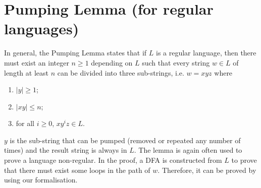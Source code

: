 \section{Pumping Lemma (for regular languages)}
\par In general, the
Pumping Lemma states that if \(L\) is a regular language, then there
must exist an integer \(n \geq 1\) depending on \(L\) such that every
string \(w \in L\) of length at least \(n\) can be divided into three
sub-strings, i.e. \(w = xyz\) where
\begin{enumerate}[nolistsep]
  \item \(|y| \geq 1\);
  \item \(|xy| \leq n\);
  \item for all \(i \geq 0\), \(xy^iz \in L\).
\end{enumerate}
\par \(y\) is the sub-string that can be pumped (removed or repeated
any number of times) and the result string is always in \(L\). The
lemma is again often used to prove a language non-regular. In the proof, a DFA is constructed from \(L\) to prove that there
must exist some loops in the path of \(w\). Therefore, it can be
proved by using our formalisation. 